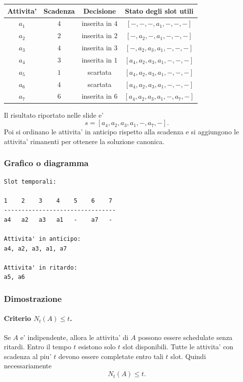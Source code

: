 \begin{center}
\begin{tabular}{c|c|c|c}
Attivita' & Scadenza & Decisione & Stato degli slot utili \\
\hline
$a_1$ & $4$ & inserita in $4$ & $[-,-,-,a_1,-,-,-]$ \\
$a_2$ & $2$ & inserita in $2$ & $[-,a_2,-,a_1,-,-,-]$ \\
$a_3$ & $4$ & inserita in $3$ & $[-,a_2,a_3,a_1,-,-,-]$ \\
$a_4$ & $3$ & inserita in $1$ & $[a_4,a_2,a_3,a_1,-,-,-]$ \\
$a_5$ & $1$ & scartata & $[a_4,a_2,a_3,a_1,-,-,-]$ \\
$a_6$ & $4$ & scartata & $[a_4,a_2,a_3,a_1,-,-,-]$ \\
$a_7$ & $6$ & inserita in $6$ & $[a_4,a_2,a_3,a_1,-,a_7,-]$
\end{tabular}
\end{center}

Il risultato riportato nelle slide e'
\[
s=[a_4,a_2,a_3,a_1,-,a_7,-].
\]
Poi si ordinano le attivita' in anticipo rispetto alla scadenza e si aggiungono le attivita' rimanenti per ottenere la soluzione canonica.

\subsubsection{Grafico o diagramma}
\begin{center}
\begin{verbatim}
Slot temporali:

1    2    3    4    5    6    7
--------------------------------
a4   a2   a3   a1   -    a7   -

Attivita' in anticipo:
a4, a2, a3, a1, a7

Attivita' in ritardo:
a5, a6
\end{verbatim}
\end{center}

\subsubsection{Dimostrazione}
\paragraph{Criterio $N_t(A)\le t$.}
Se $A$ e' indipendente, allora le attivita' di $A$ possono essere schedulate senza ritardi. Entro il tempo $t$ esistono solo $t$ slot disponibili. Tutte le attivita' con scadenza al piu' $t$ devono essere completate entro tali $t$ slot. Quindi necessariamente
\[
N_t(A)\le t.
\]

